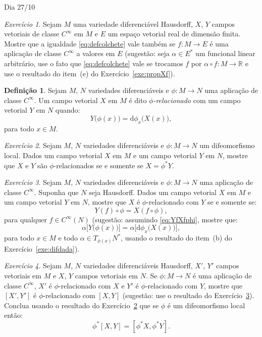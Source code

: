 \documentclass[oneside,11pt]{amsart}
\newcommand{\R}{\mathds R}
\newcommand{\dd}{\mathrm d}
\theoremstyle{remark}\newtheorem{exercise}{Exercício}[section]
\theoremstyle{plain}\newtheorem{teo}{Teorema}[section]
\theoremstyle{plain}\newtheorem{lem}[teo]{Lema}
\theoremstyle{plain}\newtheorem{prop}[teo]{Proposição}
\theoremstyle{definition}\newtheorem{defin}[teo]{Definição}
\theoremstyle{remark}\newtheorem{rem}[teo]{Observação}
\theoremstyle{definition}\newtheorem{example}[teo]{Exemplo}
\numberwithin{equation}{section}
\begin{document}
\begin{section}{Dia 27/10}
\begin{exercise}
Sejam $M$ uma variedade diferenciável Hausdorff, $X$, $Y$ campos vetoriais de classe $C^\infty$ em $M$ e $E$ um espaço vetorial real de dimensão finita.
Mostre que a igualdade \eqref{eq:defcolchete} vale também se $f:M\to E$ é uma aplicação de classe $C^\infty$ a valores em $E$
(sugestão: seja $\alpha\in E^*$ um funcional linear arbitrário,
use o fato que \eqref{eq:defcolchete} vale se trocamos $f$ por $\alpha\circ f:M\to\R$ e use o resultado do item~(e) do Exercício~\ref{exe:propXf}).
\end{exercise}

\begin{defin}
Sejam $M$, $N$ variedades diferenciáveis e $\phi:M\to N$ uma aplicação de classe $C^\infty$. Um campo vetorial $X$ em $M$ é dito {\em $\phi$-relacionado\/}
com um campo vetorial $Y$ em $N$ quando:
\[Y\big(\phi(x)\big)=\dd\phi_x\big(X(x)\big),\]
para todo $x\in M$.
\end{defin}

\begin{exercise}\label{exe:phirelpullback}
Sejam $M$, $N$ variedades diferenciáveis e $\phi:M\to N$ um difeomorfismo local. Dados um campo vetorial $X$ em $M$ e um campo vetorial $Y$ em $N$, mostre
que $X$ e $Y$ são $\phi$-relacionados se e somente se $X=\phi^*Y$.
\end{exercise}

\begin{exercise}\label{exe:phirelder}
Sejam $M$, $N$ variedades diferenciáveis e $\phi:M\to N$ uma aplicação de classe $C^\infty$. Suponha que $N$ seja Hausdorff.
Dados um campo vetorial $X$ em $M$ e um campo vetorial $Y$ em $N$, mostre que $X$ é $\phi$-relacionado com $Y$ se e somente se:
\begin{equation}\label{eq:YfXfphi}
Y(f)\circ\phi=X(f\circ\phi),
\end{equation}
para qualquer $f\in C^\infty(N)$ (sugestão: assumindo \eqref{eq:YfXfphi}, mostre que:
\[\alpha\big[Y\big(\phi(x)\big)\big]=\alpha\big[\dd\phi_x\big(X(x)\big)\big],\]
para todo $x\in M$ e todo $\alpha\in T_{\phi(x)}N^*$, usando o resultado do item~(b) do Exercício~\ref{exe:difdada}).
\end{exercise}

\begin{exercise}\label{exe:phirelLiebrack}
Sejam $M$, $N$ variedades diferenciáveis Hausdorff, $X'$, $Y'$ campos vetoriais em $M$ e $X$, $Y$ campos vetoriais em $N$. Se $\phi:M\to N$
é uma aplicação de classe $C^\infty$, $X'$ é $\phi$-relacionado com $X$ e $Y'$ é $\phi$-relacionado com $Y$, mostre que $[X',Y']$ é $\phi$-relacionado
com $[X,Y]$ (sugestão: use o resultado do Exercício~\ref{exe:phirelder}). Conclua usando o resultado do Exercício~\ref{exe:phirelpullback}
que se $\phi$ é um difeomorfismo local então:
\begin{equation}\label{eq:Liebrackpback}
\phi^*[X,Y]=[\phi^*X,\phi^*Y].
\end{equation}
\end{exercise}


\end{section}
\end{document}
